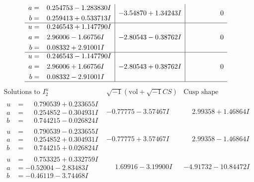 \documentclass[1p]{elsarticle_modified}
\theoremstyle{definition}
\newcommand{\I}{\sqrt{-1}}
\begin{document}
$$\begin{array}{c|c|c}
\begin{aligned}
a &= \phantom{-}0.254753 - 1.283830 I \\
b &= \phantom{-}0.259413 + 0.533713 I\end{aligned}
 & -3.54870 + 1.34243 I & \phantom{-0.000000 } 0 \\ \hline\begin{aligned}
u &= \phantom{-}0.246543 + 1.147790 I \\
a &= \phantom{-}2.96006 - 1.66756 I \\
b &= \phantom{-}0.08332 + 2.91001 I\end{aligned}
 & -2.80543 - 0.38762 I & \phantom{-0.000000 } 0 \\ \hline\begin{aligned}
u &= \phantom{-}0.246543 - 1.147790 I \\
a &= \phantom{-}2.96006 + 1.66756 I \\
b &= \phantom{-}0.08332 - 2.91001 I\end{aligned}
 & -2.80543 + 0.38762 I & \phantom{-0.000000 } 0\\
 \hline 
 \end{array}$$\newpage$$\begin{array}{c|c|c}  
\text{Solutions to }I^u_{2}& \I (\text{vol} + \sqrt{-1}CS) & \text{Cusp shape}\\
 \hline 
\begin{aligned}
u &= \phantom{-}0.790539 + 0.233655 I \\
a &= \phantom{-}0.254852 - 0.304931 I \\
b &= \phantom{-}0.744215 - 0.026824 I\end{aligned}
 & -0.77775 - 3.57467 I & \phantom{-}2.99358 + 1.46864 I \\ \hline\begin{aligned}
u &= \phantom{-}0.790539 - 0.233655 I \\
a &= \phantom{-}0.254852 + 0.304931 I \\
b &= \phantom{-}0.744215 + 0.026824 I\end{aligned}
 & -0.77775 + 3.57467 I & \phantom{-}2.99358 - 1.46864 I \\ \hline\begin{aligned}
u &= \phantom{-}0.753325 + 0.332759 I \\
a &= -0.52004 - 2.83483 I \\
b &= -0.46119 - 3.74468 I\end{aligned}
 & \phantom{-}1.69916 - 3.19900 I & -4.91732 - 10.84472 I \\ \hline\begin{aligned}

\end{aligned}
\end{array}$$
\end{document}
